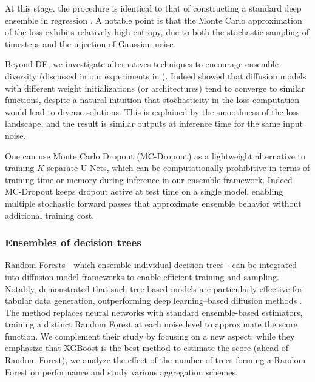 \documentclass[10pt]{article} %
\begin{document}
At this stage, the procedure is identical to that of constructing a standard deep ensemble in regression \citep{lakshminarayanan2017simple}. A notable point is that the Monte Carlo approximation of the loss exhibits relatively high entropy, due to both the stochastic sampling of timesteps and the injection of Gaussian noise. 



Beyond DE, we investigate alternatives techniques to encourage ensemble diversity (discussed in our experiments in ). Indeed \citet{xu2024towards} showed that diffusion models with different weight initializations (or architectures) tend to converge to similar functions, despite a natural intuition that stochasticity in the loss computation would lead to diverse solutions. This is explained by the smoothness of the loss landscape, and the result is similar outputs at inference time for the same input noise.


One can use Monte Carlo Dropout \citep{srivastava2014dropout, gal2016dropout, ashukha2020pitfalls} (MC-Dropout) as a lightweight alternative to training $K$ separate U-Nets, which can be computationally prohibitive in terms of training time or memory during inference in our ensemble framework. Indeed MC-Dropout keeps dropout \citep{srivastava2014dropout} active at test time on a single model, enabling multiple stochastic forward passes that approximate ensemble behavior without additional training cost.
\subsubsection{Ensembles of decision trees} \label{section: forestdiffusion}
Random Forests - which ensemble individual decision trees - can be integrated into diffusion model frameworks to enable efficient training and sampling. Notably, \citet{jolicoeur2024generating} demonstrated that such tree-based models are particularly effective for tabular data generation, outperforming deep learning–based diffusion methods \citep{kim2022stasy, kotelnikov2023tabddpm}. The method replaces neural networks with standard ensemble-based estimators, training a distinct Random Forest at each noise level to approximate the score function. We complement their study by focusing on a new aspect: while they emphasize that XGBoost is the best method to estimate the score (ahead of Random Forest), we analyze the effect of the number of trees forming a Random Forest on performance and study various aggregation schemes. 
\end{document}
